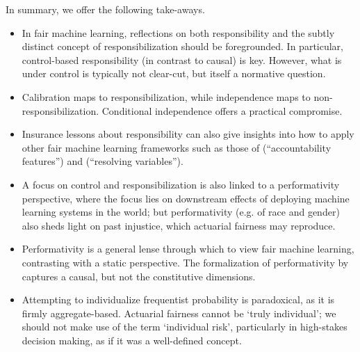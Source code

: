 \documentclass[11pt]{article} %
\makeatletter
\newcommand*{\eg}{e.g.\@\xspace}
\makeatother
\begin{document}
In summary, we offer the following take-aways.
\begin{itemize}
\item In fair machine learning, reflections on both responsibility and the subtly distinct concept of responsibilization should be foregrounded.
In particular, control-based responsibility (in contrast to causal) is key. However, what is under control is typically not clear-cut, but itself a normative question.
\item Calibration maps to responsibilization, while independence maps to non-responsibilization. Conditional independence offers a practical compromise.
\item Insurance lessons about responsibility can also give insights into how to apply other fair machine learning frameworks such as those of \citet{heidari2019moral} (``accountability features'') and \citet{kilbertus2017avoiding} (``resolving variables'').
\item A focus on control and responsibilization is also linked to a performativity perspective, where the focus lies on downstream effects of deploying machine learning systems in the world; but performativity (\eg of race and gender) also sheds light on past injustice, which actuarial fairness may reproduce.
\item Performativity is a general lense through which to view fair machine learning, contrasting with a static perspective. The formalization of performativity by \citet{perdomo2020performative} captures a causal, but not the constitutive dimensions.
 \item Attempting to individualize frequentist probability is paradoxical, as it is firmly aggregate-based. Actuarial fairness cannot be `truly individual'; we should not make use of the term `individual risk', particularly in high-stakes decision making, as if it was a well-defined concept.
\end{itemize}




\end{document}
